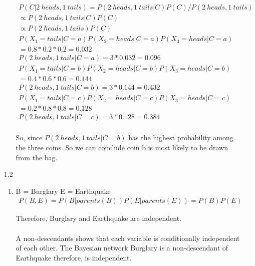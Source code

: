 \documentclass[letterpaper, 12pt]{article}
\begin{document}
\begin{enumerate}
\begin{enumerate}
                  \begin{gather*}
                      P(C|2\ heads, 1\ tails) = P(2\ heads, 1\ tails|C)P(C) / P(2\ heads, 1\ tails) \\
                      \propto P(2\ heads, 1\ tails|C)P(C) \\
                      \propto P(2\ heads, 1\ tails)P(C) \\
                      P(X_1 = tails|C=a)P(X_2 =heads|C=a)P(X_3 = heads|C=a) \\= 0.8*0.2*0.2=0.032 \\
                      P(2\ heads, 1\ tails|C=a) = 3*0.032=0.096 \\
                      P(X_1 = tails|C=b)P(X_2 =heads|C=b)P(X_3 = heads|C=b) \\= 0.4*0.6*0.6=0.144 \\
                      P(2\ heads, 1\ tails|C=b) = 3*0.144=0.432 \\
                      P(X_1 = tails|C=c)P(X_2 =heads|C=c)P(X_3 = heads|C=c) \\= 0.2*0.8*0.8=0.128 \\
                      P(2\ heads, 1\ tails|C=c) = 3*0.128=0.384 \\
                  \end{gather*}

                  So, since $P(2\ heads, 1\ tails|C=b)$ has the highest probability among the three coins. So we can conclude coin b is
                  most likely to be drawn from the bag.
        \end{enumerate}
    \item[1.2]
        \begin{enumerate}
            \item
                  B = Burglary E = Earthquake
                  \begin{gather*}
                      P(B, E)=P(B|parents(B))P(E|parents(E))=P(B)P(E)
                  \end{gather*}

                  Therefore, Burglary and Earthquake are independent. \\ \\

                  A non-descendants shows that each variable is conditionally independent of each other.
                  The Bayesian network Burglary is a non-descendant of Earthquake therefore, is independent.


\end{enumerate}
\end{enumerate}
\end{document}

